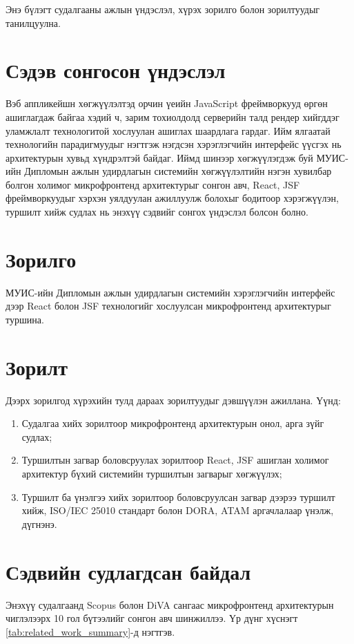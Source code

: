 Энэ бүлэгт судалгааны ажлын үндэслэл, хүрэх зорилго болон зорилтуудыг танилцуулна.
\section{Сэдэв сонгосон үндэслэл}
Вэб аппликейшн хөгжүүлэлтэд орчин үеийн JavaScript фреймворкууд өргөн ашиглагдаж байгаа хэдий ч, зарим тохиолдолд серверийн талд рендер хийгддэг уламжлалт технологитой хослуулан ашиглах шаардлага гардаг. Ийм ялгаатай технологийн парадигмуудыг нэгтгэж нэгдсэн хэрэглэгчийн интерфейс үүсгэх нь архитектурын хувьд хүндрэлтэй байдаг. Иймд шинээр хөгжүүлэгдэж буй МУИС-ийн Дипломын ажлын удирдлагын системийн хөгжүүлэлтийн нэгэн хувилбар болгон холимог микрофронтенд архитектурыг сонгон авч, React, JSF фреймворкуудыг хэрхэн уялдуулан ажиллуулж болохыг бодитоор хэрэгжүүлэн, туршилт хийж судлах нь энэхүү сэдвийг сонгох үндэслэл болсон болно.
\section{Зорилго}
	\quad \quad	МУИС-ийн Дипломын ажлын удирдлагын системийн хэрэглэгчийн интерфейс дээр React болон JSF технологийг хослуулсан микрофронтенд архитектурыг туршина.
\section{Зорилт}
	Дээрх зорилгод хүрэхийн тулд дараах зорилтуудыг дэвшүүлэн ажиллана. Үүнд:
\begin{enumerate}
	\item Судалгаа хийх зорилтоор микрофронтенд архитектурын онол, арга зүйг судлах;
	\item Туршилтын загвар боловсруулах зорилтоор React, JSF ашиглан холимог архитектур бүхий системийн туршилтын загварыг хөгжүүлэх;
	\item Туршилт ба үнэлгээ хийх зорилтоор боловсруулсан загвар дээрээ туршилт хийж, ISO/IEC 25010 стандарт болон DORA, ATAM аргачлалаар үнэлж, дүгнэнэ.
\end{enumerate}

\section{Сэдвийн судлагдсан байдал}
Энэхүү судалгаанд Scopus болон DiVA сангаас микрофронтенд архитектурын чиглэлээрх 10 гол бүтээлийг сонгон авч шинжиллээ. Үр дүнг хүснэгт \ref{tab:related_work_summary}-д нэгтгэв.

